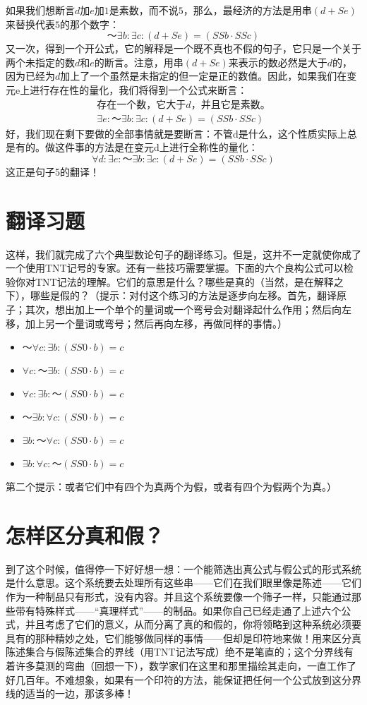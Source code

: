 如果我们想断言$d$加$e$加$1$是素数，而不说$5$，那么，最经济的方法是用串$(d+Se)$来替换代表$5$的那个数字：
\[
～\exists b:\exists c:(d+Se)=(SSb\cdot SSc)
\]
又一次，得到一个开公式，它的解释是一个既不真也不假的句子，它只是一个关于两个未指定的数$d$和$e$的断言。注意，用串$(d+Se)$来表示的数必然是大于$d$的，因为已经为$d$加上了一个虽然是未指定的但一定是正的数值。因此，如果我们在变元e上进行存在性的量化，我们将得到一个公式来断言：
\[
\begin{gathered}
\text{存在一个数，它大于$d$，并且它是素数。}\\
\exists e:～\exists b:\exists c:(d+Se)=(SSb\cdot SSc)
\end{gathered}
\]
好，我们现在剩下要做的全部事情就是要断言：不管d是什么，这个性质实际上总是有的。做这件事的方法是在变元d上进行全称性的量化：
\[
\forall d:\exists e:～\exists b:\exists c:(d+Se)=(SSb\cdot SSc)
\]
这正是句子5的翻译！

\section{翻译习题}

这样，我们就完成了六个典型数论句子的翻译练习。但是，这并不一定就使你成了一个使用TNT记号的专家。还有一些技巧需要掌握。下面的六个良构公式可以检验你对TNT记法的理解。它们的意思是什么？哪些是真的（当然，是在解释之下），哪些是假的？（提示：对付这个练习的方法是逐步向左移。首先，翻译原子；其次，想出加上一个单个的量词或一个弯号会对翻译起什么作用；然后向左移，加上另一个量词或弯号；然后再向左移，再做同样的事情。）
\begin{itemize}
\item $～\forall c:\exists b:(SS0\cdot b)=c$
\item $\forall c:～\exists b:(SS0\cdot b)=c$
\item $\forall c:\exists b:～(SS0\cdot b)=c$
\item $～\exists b:\forall c:(SS0\cdot b)=c$
\item $\exists b:～\forall c:(SS0\cdot b)=c$
\item $\exists b:\forall c:～(SS0\cdot b)=c$
\end{itemize}
第二个提示：或者它们中有四个为真两个为假，或者有四个为假两个为真。）

\section{怎样区分真和假？}

到了这个时候，值得停一下好好想一想：一个能筛选出真公式与假公式的形式系统是什么意思。这个系统要去处理所有这些串——它们在我们眼里像是陈述——它们作为一种制品只有形式，没有内容。并且这个系统要像一个筛子一样，只能通过那些带有特殊样式——“真理样式”——的制品。如果你自己已经走通了上述六个公式，并且考虑了它们的意义，从而分离了真的和假的，你将领略到这种系统必须要具有的那种精妙之处，它们能够做同样的事情——但却是印符地来做！用来区分真陈述集合与假陈述集合的界线（用TNT记法写成）绝不是笔直的；这个分界线有着许多莫测的弯曲（回想一下），数学家们在这里和那里描绘其走向，一直工作了好几百年。不难想象，如果有一个印符的方法，能保证把任何一个公式放到这分界线的适当的一边，那该多棒！

